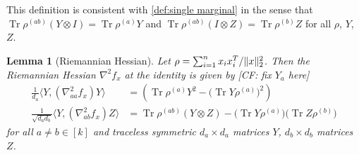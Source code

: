 \documentclass{article}
\newtheorem{lemma}[theorem]{Lemma}
\DeclarePairedDelimiter{\norm}{\lVert}{\rVert}
\newcommand{\ot}{\otimes}
\newcommand\samp{x}
\newcommand\tr{\operatorname{Tr}}
\newcommand{\CF}[1]{{\color{purple}[CF: #1]}}
\begin{document}
\noindent
This definition is consistent with \cref{def:single marginal} in the sense that $\tr \rho^{(ab)} (Y \ot I) = \tr \rho^{(a)} Y$ and $\tr \rho^{(ab)} (I \ot Z) = \tr \rho^{(b)} Z$ for all $\rho$, $Y$, $Z$.

\begin{lemma}[Riemannian Hessian]\label{lem:hessian}
Let $\rho = \sum_{i=1}^n \samp_i \samp_i^T / \norm{\samp}_2^2$.
Then the Riemannian Hessian $\nabla^2 f_{\samp}$ at the identity is given by \CF{fix $Y_a$ here}
\begin{align*}
 \frac{1}{d_a} \langle Y,  \left( \nabla^2_{aa} f_{\samp} \right) Y \rangle
&= \left( \tr \rho^{(a)} Y^2 - \bigl(\tr Y \rho^{(a)}\bigr)^2 \right) \\
  \frac1{\sqrt{d_a d_b}} \langle Y,  \left( \nabla^2_{ab} f_{\samp} \right) Z \rangle
&= \tr \rho^{(ab)} \left( Y \ot Z \right) - \bigl(\tr Y \rho^{(a)}\bigr)\bigl(\tr Z \rho^{(b)}\bigr) 
\end{align*}
for all $a\neq b\in[k]$ and traceless symmetric $d_a\times d_a$ matrices $Y$, $d_b\times d_b$ matrices~$Z$.
\end{lemma}
\end{document}
